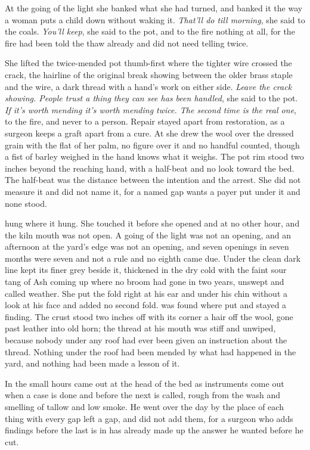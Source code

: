 At the going of the light she banked what she had turned, and banked it the way a woman puts a child down without waking it. \emph{That'll do till morning}, she said to the coals. \emph{You'll keep}, she said to the pot, and to the fire nothing at all, for the fire had been told the thaw already and did not need telling twice.

She lifted the twice-mended pot thumb-first where the tighter wire crossed the crack, the hairline of the original break showing between the older brass staple and the wire, a dark thread with a hand's work on either side. \emph{Leave the crack showing. People trust a thing they can see has been handled}, she said to the pot. \emph{If it's worth mending it's worth mending twice. The second time is the real one}, to the fire, and never to a person. Repair stayed apart from restoration, as a surgeon keeps a graft apart from a cure. At  she drew the wool over the dressed grain with the flat of her palm, no figure over it and no handful counted, though a fist of barley weighed in the hand knows what it weighs. The pot rim stood two inches beyond the reaching hand, with a half-beat and no look toward the bed. The half-beat was the distance between the intention and the arrest. She did not measure it and did not name it, for a named gap wants a payer put under it and none stood.

 hung where it hung. She touched it before she opened  and at no other hour, and the kiln mouth was not open. A going of the light was not an opening, and an afternoon at the yard's edge was not an opening, and seven openings in seven months were seven and not a rule and no eighth came due. Under  the clean dark line kept its finer grey beside it, thickened in the dry cold with the faint sour tang of Ash coming up where no broom had gone in two years, unswept and called weather. She put the fold right at his ear and under his chin without a look at his face and added no second fold.  was found where put and stayed a finding. The crust stood two inches off with its corner a hair off the wool, gone past leather into old horn; the thread at his mouth was stiff and unwiped, because nobody under any roof had ever been given an instruction about the thread. Nothing under the roof had been mended by what had happened in the yard, and nothing had been made a lesson of it.

\scenebreak

In the small hours  came out at the head of the bed as instruments come out when a case is done and before the next is called, rough from the wash and smelling of tallow and low smoke. He went over the day by the place of each thing with every gap left a gap, and did not add them, for a surgeon who adds findings before the last is in has already made up the answer he wanted before he cut.

